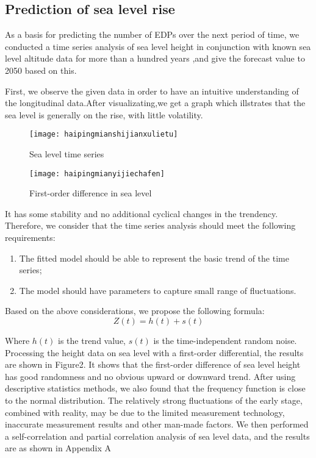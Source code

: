 \documentclass{mcmthesis}
\begin{document}
\subsection{Prediction of sea level rise}

As a basis for predicting the number of EDPs over the next period of time, we conducted a time series analysis of sea level height in conjunction with known sea level altitude data for more than a hundred years ,and give the forecast value to 2050 based on this.

First, we observe the given data in order to have an intuitive understanding of the longitudinal data.After visualizating,we get a graph which illstrates that the sea level is generally on the rise, with little volatility.
\begin{figure}[H]%
	\begin{minipage}[t]{0.5\textwidth}
		\centering
		\texttt{[image: haipingmianshijianxulietu]}
		\caption{Sea level time series\label{fig:1}}
	\end{minipage}
	\qquad
	\begin{minipage}[t]{0.5\textwidth}
		\centering
		\texttt{[image: haipingmianyijiechafen]}
		\caption{First-order difference in sea level\label{fig:2}}
	\end{minipage}
\end{figure}

It has some stability and no additional cyclical changes in the trendency. Therefore, we consider that the time series analysis should meet the following requirements:
\begin{enumerate}
\item The fitted model should be able to represent the basic trend of the time series;
\item The model should have parameters to capture small range of fluctuations.
\end{enumerate}

Based on the above considerations, we propose the following formula:
\begin{equation}%
Z(t)=h(t)+s(t)
\end{equation}

Where  $ h(t) $ is the trend value, $ s(t) $ is the time-independent random noise. Processing the height data on sea level with a first-order differential, the results are shown in Figure2. It shows that the first-order difference of sea level height has good randomness and no obvious upward or downward trend. After using descriptive statistics methods, we also found that the frequency function is close to the normal distribution. The relatively strong fluctuations of the early stage, combined with reality, may be due to the limited measurement technology, inaccurate measurement results and other man-made factors. We then performed a self-correlation and partial correlation analysis of sea level data, and the results are as shown in Appendix A
\end{document}
